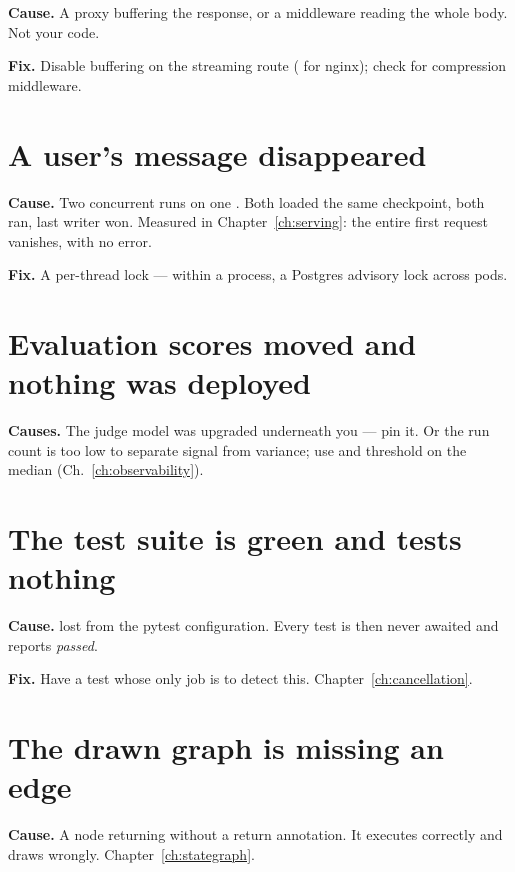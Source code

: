 \textbf{Cause.} A proxy buffering the response, or a middleware reading the whole
body. Not your code.

\textbf{Fix.} Disable buffering on the streaming route
( for nginx); check for compression middleware.

\section{A user's message disappeared}
\label{sec:tsM}

\textbf{Cause.} Two concurrent runs on one . Both loaded the
same checkpoint, both ran, last writer won. Measured in
Chapter~\ref{ch:serving}: the entire first request vanishes, with no error.

\textbf{Fix.} A per-thread lock ---  within a process, a
Postgres advisory lock across pods.

\section{Evaluation scores moved and nothing was deployed}
\label{sec:tsN}

\textbf{Causes.} The judge model was upgraded underneath you --- pin it. Or the
run count is too low to separate signal from variance; use
 and threshold on the median
(Ch.~\ref{ch:observability}).

\section{The test suite is green and tests nothing}
\label{sec:tsO}

\textbf{Cause.}  lost from the pytest configuration. Every
 test is then never awaited and reports \emph{passed}.

\textbf{Fix.} Have a test whose only job is to detect this.
Chapter~\ref{ch:cancellation}.

\section{The drawn graph is missing an edge}
\label{sec:tsP}

\textbf{Cause.} A node returning  without a
 return annotation. It executes correctly and draws
wrongly. Chapter~\ref{ch:stategraph}.
